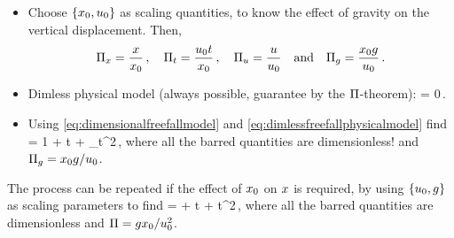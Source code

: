 \begin{itemize}
%
\item Choose $\left\lbrace{x_0, u_0}\right\rbrace$ as scaling quantities, to know the effect of gravity on the vertical displacement. Then,
\begin{equation}\label{eq:dimlessfreefallphysicalmodel}
\Pi_x  = \dfrac{x}{x_0}\,, \quad
\Pi_t     = \dfrac{u_0 t}{x_0}\,, \quad
\Pi_u  = \dfrac{u}{u_0}\quad\text{and}\quad
\Pi_g = \dfrac{x_0g}{u_0}\,.
\end{equation}
%
\item Dimless physical model (always possible, guarantee by the $\Pi$-theorem):
\beq
\kdimf{} = 0\,.
\eeq
%
\item Using \cref{eq:dimensionalfreefallmodel} and \cref{eq:dimlessfreefallphysicalmodel} find
\beq
\scpq\pos = 1 + \scpq t + \kdim_\grav \scpq t^2\,,
\eeq
where all the barred quantities are dimensionless! and $\Pi_g = x_0g/u_0$.
%
\end{itemize}
%
The process can be repeated if the effect of $x_0$ on $x$ is required, by using $\left\lbrace{u_0, g}\right\rbrace$ as scaling parameters to find
\beq
\scpq\pos = \kdim + t + \scpq t^2\,,
\eeq
where all the barred quantities are dimensionless and $\Pi = gx_0/u_0^2$.


